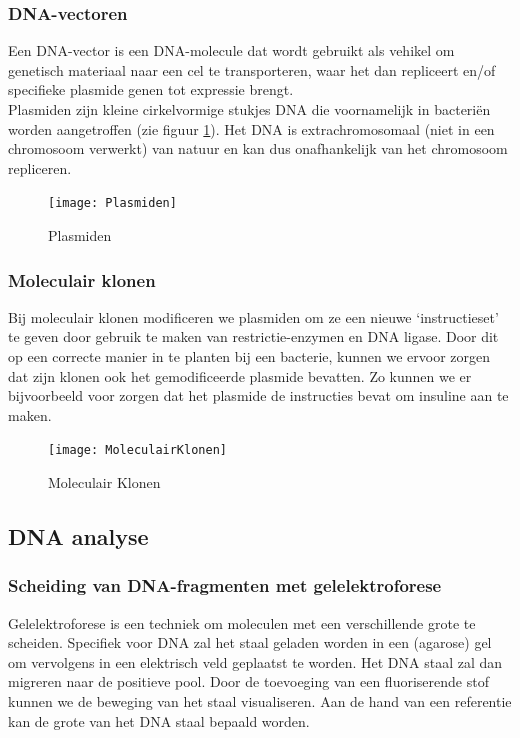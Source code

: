 \documentclass[a4paper,kul]{kulakarticle} %
\begin{document}
\subsubsection{DNA-vectoren}
Een DNA-vector is een DNA-molecule dat wordt gebruikt als vehikel om genetisch materiaal naar een cel te transporteren, waar het dan repliceert en/of specifieke plasmide genen tot expressie brengt. 
\\
Plasmiden zijn kleine cirkelvormige stukjes DNA die voornamelijk in bacteriën worden aangetroffen (zie figuur \ref{fig:plasmiden}). Het DNA is extrachromosomaal (niet in een chromosoom verwerkt) van natuur en kan dus onafhankelijk van het chromosoom repliceren. 
\begin{figure}[h]
	\centering
	\texttt{[image: Plasmiden]}
	\caption[Plasmids]{Plasmiden}
	\label{fig:plasmiden}
\end{figure}
\newpage
\subsubsection{Moleculair klonen}
Bij moleculair klonen modificeren we plasmiden om ze een nieuwe `instructieset' te geven door gebruik te maken van restrictie-enzymen en DNA ligase. Door dit op een correcte manier in te planten bij een bacterie, kunnen we ervoor zorgen dat zijn klonen ook het gemodificeerde plasmide bevatten. Zo kunnen we er bijvoorbeeld voor zorgen dat het plasmide de instructies bevat om insuline aan te maken. 
\begin{figure}[h]
	\centering
	\texttt{[image: MoleculairKlonen]}
	\caption[Moleculair klonen]{Moleculair Klonen}
	\label{fig:moleculairklonen}
\end{figure}
\subsection{DNA analyse}
\subsubsection{Scheiding van DNA-fragmenten met gelelektroforese}                                            
Gelelektroforese is een techniek om moleculen met een verschillende grote te scheiden. Specifiek voor DNA zal het staal geladen worden in een (agarose) gel om vervolgens in een elektrisch veld geplaatst te worden. Het DNA staal zal dan migreren naar de positieve pool. Door de toevoeging van een fluoriserende stof kunnen we de beweging van het staal visualiseren. Aan de hand van een referentie kan de grote van het DNA staal bepaald worden. 
\end{document}
